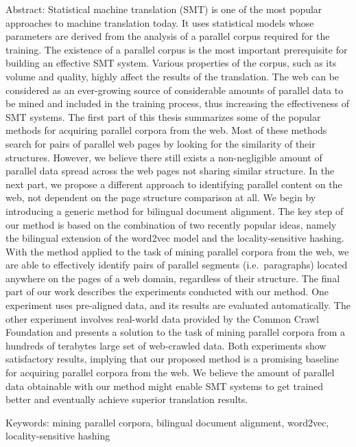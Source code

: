 Abstract: Statistical machine translation (SMT) is one of the most popular approaches to machine translation today. It uses statistical models whose parameters are derived from the analysis of a parallel corpus required for the training. The existence of a parallel corpus is the most important prerequisite for building an effective SMT system. Various properties of the corpus, such as its volume and quality, highly affect the results of the translation.  The web can be considered as an ever-growing source of considerable amounts of parallel data to be mined and included in the training process, thus increasing the effectiveness of SMT systems. The first part of this thesis summarizes some of the popular methods for acquiring parallel corpora from the web. Most of these methods search for pairs of parallel web pages by looking for the similarity of their structures. However, we believe there still exists a non-negligible amount of parallel data spread across the web pages not sharing similar structure. In the next part, we propose a different approach to identifying parallel content on the web, not dependent on the page structure comparison at all. We begin by introducing a generic method for bilingual document alignment. The key step of our method is based on the combination of two recently popular ideas, namely the bilingual extension of the word2vec model and the locality-sensitive hashing. With the method applied to the task of mining parallel corpora from the web, we are able to effectively identify pairs of parallel segments (i.e.\ paragraphs) located anywhere on the pages of a web domain, regardless of their structure. The final part of our work describes the experiments conducted with our method. One experiment uses pre-aligned data, and its results are evaluated automatically. The other experiment involves real-world data provided by the Common Crawl Foundation and presents a solution to the task of mining parallel corpora from a hundreds of terabytes large set of web-crawled data. Both experiments show satisfactory results, implying that our proposed method is a promising baseline for acquiring parallel corpora from the web. We believe the amount of parallel data obtainable with our method might enable SMT systems to get trained better and eventually achieve superior translation results.

Keywords: mining parallel corpora, bilingual document alignment, word2vec, locality-sensitive hashing
